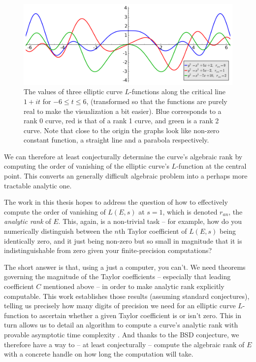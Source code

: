 \begin{figure}[!h]
    \centering
    \includegraphics[width=1.0\textwidth]{graphics/L-functions_at_origin.png}
    \caption{The values of three elliptic curve $L$-functions along the critical line $1+it$ for $-6 \le t \le 6$, (transformed so that the functions are purely real to make the visualization a bit easier). Blue corresponds to a rank 0 curve, red is that of a rank 1 curve, and green is a rank 2 curve. Note that close to the origin the graphs look like non-zero constant function, a straight line and a parabola respectively.}
    \label{fig:L-functions_at_origin}
\end{figure}

We can therefore at least conjecturally determine the curve's algebraic rank by computing the order of vanishing of the elliptic curve's $L$-function at the central point. This converts an generally difficult algebraic problem into a perhaps more tractable analytic one.

The work in this thesis hopes to address the question of how to effectively compute the order of vanishing of $L(E,s)$ at $s=1$, which is denoted $r_{an}$, the {\it analytic rank} of $E$. This, again, is a non-trivial task -- for example, how do you numerically distinguish between the $n$th Taylor coefficient of $L(E,s)$ being identically zero, and it just being non-zero but so small in magnitude that it is indistinguishable from zero given your finite-precision computations?

The short answer is that, using a just a computer, you can't. We need theorems governing the magnitude of the Taylor coefficients -- especially that leading coefficient $C$ mentioned above -- in order to make analytic rank explicitly computable. This work establishes those results (assuming standard conjectures), telling us precisely how many digits of precision we need for an elliptic curve $L$-function to ascertain whether a given Taylor coefficient is or isn't zero. This in turn allows us to detail an algorithm to compute a curve's analytic rank with provable asymptotic time complexity . And thanks to the BSD conjecture, we therefore have a way to -- at least conjecturally -- compute the algebraic rank of $E$ with a concrete handle on how long the computation will take. \\

